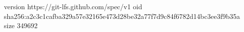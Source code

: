 version https://git-lfs.github.com/spec/v1
oid sha256:a2c3c1cafba329a57e32165e473d28be32a77f7d9c84f6782d14bc3ee3f9b35a
size 349692
